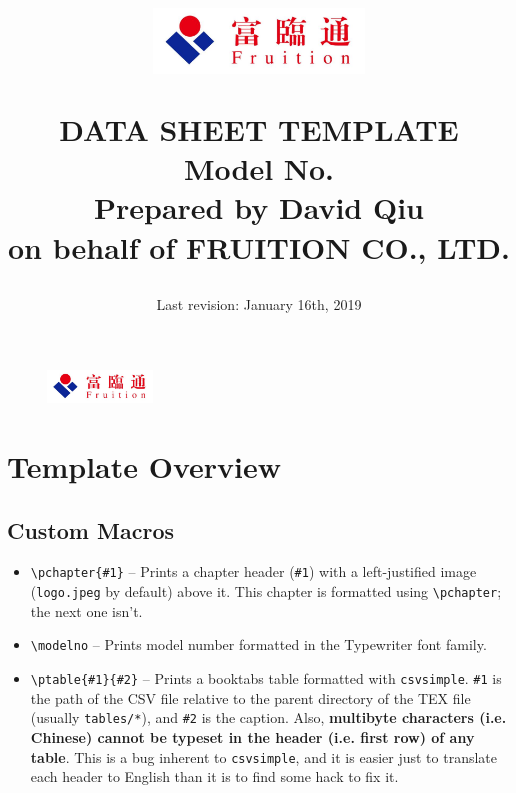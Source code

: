 \documentclass{scrreprt}
\title{
	\begin{figure}[H]
		\centering\includegraphics[width=0.5\textwidth]{logo.jpeg}
	\end{figure}
	\vspace{1cm}
	\flushright
	\Huge{DATA SHEET TEMPLATE}\\
	\vspace{2cm}
	\huge{Model No. \modelno}\\
	\vspace{2cm}
	\LARGE{Prepared by David Qiu \\ on behalf of FRUITION CO., LTD.}
}
\date{
	Last revision: January 16th, 2019\\
}
\newcommand{\pchapter}[1]{
	\begingroup\let\clearpage\relax
	\newpage
	\begin{figure}[H]
		\includegraphics[width=0.25\textwidth]{logo.jpeg}
	\end{figure}
	\chapter{#1}
	\endgroup
}
\newcommand{\modelno}{
	\texttt{<++>}
}
\newcommand{\ptable}[2]{
	\begin{table}[H]
	\caption{#2}
	\centering\csvautobooktabular{#1}
	\end{table}
}
\begin{document}
\begin{CJK*}{UTF8}{gbsn}
\maketitle
\tableofcontents

\pchapter{Template Overview}
\section{Custom Macros}
\begin{itemize}
\item \verb|\pchapter{#1}| -- Prints a chapter header (\verb|#1|) with a
left-justified image (\verb|logo.jpeg| by default) above it. This chapter is
formatted using \verb|\pchapter|; the next one isn't.

\item \verb|\modelno| -- Prints model number formatted in the Typewriter font
family.

\item \verb|\ptable{#1}{#2}| -- Prints a booktabs table formatted with
\verb|csvsimple|. \verb|#1| is the path of the CSV file relative to the parent
directory of the TEX file (usually \verb|tables/*|), and \verb|#2| is the
caption. Also, \textbf{multibyte characters (i.e. Chinese) cannot be typeset in
the header (i.e. first row) of any table}. This is a bug inherent to
\verb|csvsimple|, and it is easier just to translate each header to English than
it is to find some hack to fix it.
\end{itemize}

\Blinddocument

\end{CJK*}
\end{document}
